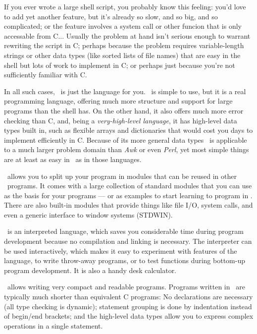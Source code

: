 If you ever wrote a large shell script, you probably know this feeling:
you'd love to add yet another feature, but it's already so slow, and so
big, and so complicated; or the feature involves a system call or other
funcion that is only accessable from C...
Usually the problem at hand isn't serious enough to warrant rewriting
the script in C; perhaps because the problem requires variable-length
strings or other data types (like sorted lists of file names) that
are easy in the shell but lots of work to implement in C; or perhaps
just because you're not sufficiently familiar with C.

In all such cases, \Python\ is just the language for you.
\Python\ is simple to use, but it is a real programming language, offering
much more structure and support for large programs than the shell has.
On the other hand, it also offers much more error checking than C, and,
being a
{\it very-high-level language},
it has high-level data types built in, such as flexible arrays and
dictionaries that would cost you days to implement efficiently in C.
Because of its more general data types \Python\ is applicable to a
much larger problem domain than
{\it Awk}
or even
{\it Perl},
yet most simple things are at least as easy in \Python\ as in those
languages.

\Python\ allows you to split up your program in modules that can be reused
in other \Python\ programs.
It comes with a large collection of standard modules that you can use as
the basis for your programs --- or as examples to start learning to
program in \Python.
There are also built-in modules that provide things like file I/O,
system calls, and even a generic interface to window systems (STDWIN).

\Python\ is an interpreted language, which saves you considerable time
during program development because no compilation and linking is
necessary.
The interpreter can be used interactively, which makes it easy to
experiment with features of the language, to write throw-away programs,
or to test functions during bottom-up program development.
It is also a handy desk calculator.

\Python\ allows writing very compact and readable programs.
Programs written in \Python\ are typically much shorter than equivalent C
programs:
No declarations are necessary (all type checking is
dynamic); statement grouping is done by indentation instead of begin/end
brackets; and the high-level data types allow you to express complex
operations in a single statement.

